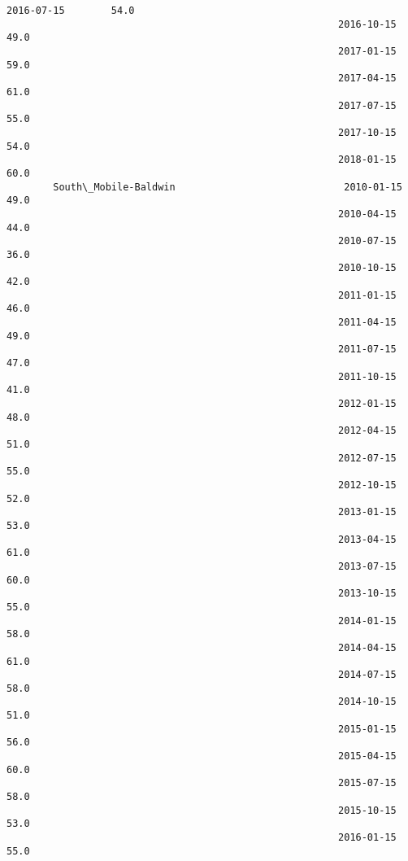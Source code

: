 \documentclass[11pt]{article}
\begin{document}
\begin{Verbatim}[commandchars=\\\{\}]
                                                         2016-07-15        54.0   
                                                         2016-10-15        49.0   
                                                         2017-01-15        59.0   
                                                         2017-04-15        61.0   
                                                         2017-07-15        55.0   
                                                         2017-10-15        54.0   
                                                         2018-01-15        60.0   
        South\_Mobile-Baldwin                             2010-01-15        49.0   
                                                         2010-04-15        44.0   
                                                         2010-07-15        36.0   
                                                         2010-10-15        42.0   
                                                         2011-01-15        46.0   
                                                         2011-04-15        49.0   
                                                         2011-07-15        47.0   
                                                         2011-10-15        41.0   
                                                         2012-01-15        48.0   
                                                         2012-04-15        51.0   
                                                         2012-07-15        55.0   
                                                         2012-10-15        52.0   
                                                         2013-01-15        53.0   
                                                         2013-04-15        61.0   
                                                         2013-07-15        60.0   
                                                         2013-10-15        55.0   
                                                         2014-01-15        58.0   
                                                         2014-04-15        61.0   
                                                         2014-07-15        58.0   
                                                         2014-10-15        51.0   
                                                         2015-01-15        56.0   
                                                         2015-04-15        60.0   
                                                         2015-07-15        58.0   
                                                         2015-10-15        53.0   
                                                         2016-01-15        55.0   

\end{Verbatim}
\end{document}
